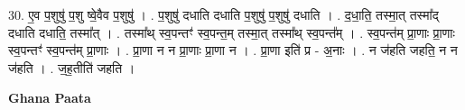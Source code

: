 \documentclass[17pt]{extarticle}
\begin{document}
30. ए॒व प॒शुषु॑ प॒शु ष्वे॒वैव प॒शुषु॑ । . प॒शुषु॑ दधाति दधाति प॒शुषु॑ प॒शुषु॑ दधाति । . द॒धा॒ति॒ तस्मा॒त् तस्मा᳚द् दधाति दधाति॒ तस्मा᳚त् । . तस्मा᳚थ् स्व॒पन्तꣳ॑ स्व॒पन्त॒म् तस्मा॒त् तस्मा᳚थ् स्व॒पन्त᳚म् । . स्व॒पन्त॑म् प्रा॒णाः प्रा॒णाः स्व॒पन्तꣳ॑ स्व॒पन्त॑म् प्रा॒णाः । . प्रा॒णा न न प्रा॒णाः प्रा॒णा न । . प्रा॒णा इति॑ प्र - अ॒नाः । . न ज॑हति जहति॒ न न ज॑हति । . ज॒ह॒तीति॑ जहति । \newline

\textbf{Ghana Paata } \newline
\end{document}
